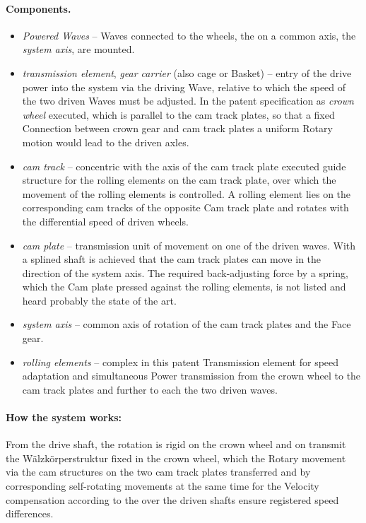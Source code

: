\documentclass[11pt,a4paper]{article}
\begin{document}
\paragraph{Components.}
\begin{itemize}
\item \emph{Powered Waves} -- Waves connected to the wheels, the on a common
  axis, the \emph{system axis}, are mounted.
\item \emph{transmission element}, \emph{gear carrier} (also cage or Basket)
  -- entry of the drive power into the system via the driving Wave, relative
  to which the speed of the two driven Waves must be adjusted. In the patent
  specification as \emph{crown wheel} executed, which is parallel to the cam
  track plates, so that a fixed Connection between crown gear and cam track
  plates a uniform Rotary motion would lead to the driven axles.
\item \emph{cam track} -- concentric with the axis of the cam track plate
  executed guide structure for the rolling elements on the cam track plate,
  over which the movement of the rolling elements is controlled. A rolling
  element lies on the corresponding cam tracks of the opposite Cam track plate
  and rotates with the differential speed of driven wheels.
\item \emph{cam plate} -- transmission unit of movement on one of the driven
  waves. With a splined shaft is achieved that the cam track plates can move
  in the direction of the system axis.  The required back-adjusting force by a
  spring, which the Cam plate pressed against the rolling elements, is not
  listed and heard probably the state of the art.
\item \emph{system axis} -- common axis of rotation of the cam track plates
  and the Face gear.
\item \emph{rolling elements} -- complex in this patent Transmission element
  for speed adaptation and simultaneous Power transmission from the crown
  wheel to the cam track plates and further to each the two driven waves.
\end{itemize}

\paragraph{How the system works:}
From the drive shaft, the rotation is rigid on the crown wheel and on transmit
the Wälzkörperstruktur fixed in the crown wheel, which the Rotary movement via
the cam structures on the two cam track plates transferred and by
corresponding self-rotating movements at the same time for the Velocity
compensation according to the over the driven shafts ensure registered speed
differences.
\end{document}
